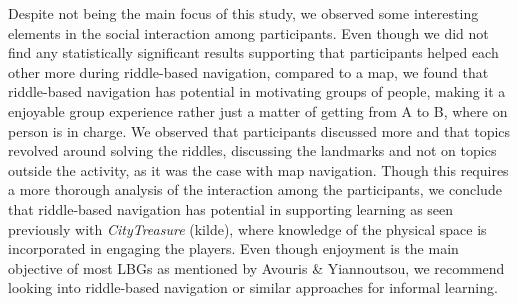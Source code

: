 Despite not being the main focus of this study, we observed some interesting elements in the social interaction among participants. Even though we did not find any statistically significant results supporting that participants helped each other more during riddle-based navigation, compared to a map, we found that riddle-based navigation has potential in motivating groups of people, making it a enjoyable group experience rather just a matter of getting from A to B, where on person is in charge. We observed that participants discussed more and that topics revolved around solving the riddles, discussing the landmarks and not on topics outside the activity, as it was the case with map navigation. Though this requires a more thorough analysis of the interaction among the participants, we conclude that riddle-based navigation has potential in supporting learning as seen previously with \textit{CityTreasure} (kilde), where knowledge of the physical space is incorporated in engaging the players. Even though enjoyment is the main objective of most LBGs as mentioned by Avouris \& Yiannoutsou, we recommend looking into riddle-based navigation or similar approaches for informal learning. 




